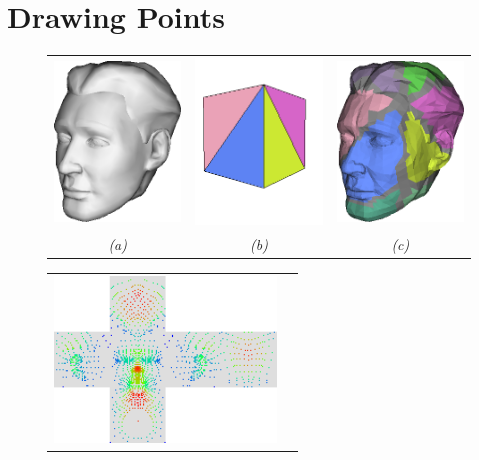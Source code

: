 \section{\label{sec:dispmapcreation:points}Drawing Points}

\begin{figure}
\begin{center}
\begin{tabular}{ccc}
\includegraphics[width=4cm]{../images/cubehead_detail} &
\includegraphics[width=4cm]{../images/cubehead_control_colour} &
\includegraphics[width=4cm]{../images/cubehead_mapflat} \\
{\it (a)} & {\it (b)} & {\it (c)}
\end{tabular}
\begin{tabular}{cc}
\includegraphics[width=5.9cm]{../images/cubehead_bigpoints} &

\end{tabular}
\end{center}
\end{figure}
